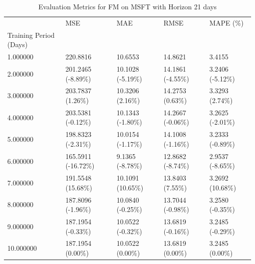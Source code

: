 \begin{table}
\caption{Evaluation Metrics for FM on MSFT with Horizon 21 days}
\label{tab:fm_MSFT_h21_metrics}
\begin{tabular}{lllll}
\toprule
 & MSE & MAE & RMSE & MAPE (\%) \\
Training Period (Days) &  &  &  &  \\
\midrule
1.000000 & 220.8816 & 10.6553 & 14.8621 & 3.4155 \\
2.000000 & 201.2465 (-8.89\%) & 10.1028 (-5.19\%) & 14.1861 (-4.55\%) & 3.2406 (-5.12\%) \\
3.000000 & 203.7837 (1.26\%) & 10.3206 (2.16\%) & 14.2753 (0.63\%) & 3.3293 (2.74\%) \\
4.000000 & 203.5381 (-0.12\%) & 10.1343 (-1.80\%) & 14.2667 (-0.06\%) & 3.2625 (-2.01\%) \\
5.000000 & 198.8323 (-2.31\%) & 10.0154 (-1.17\%) & 14.1008 (-1.16\%) & 3.2333 (-0.89\%) \\
6.000000 & 165.5911 (-16.72\%) & 9.1365 (-8.78\%) & 12.8682 (-8.74\%) & 2.9537 (-8.65\%) \\
7.000000 & 191.5548 (15.68\%) & 10.1091 (10.65\%) & 13.8403 (7.55\%) & 3.2692 (10.68\%) \\
8.000000 & 187.8096 (-1.96\%) & 10.0840 (-0.25\%) & 13.7044 (-0.98\%) & 3.2580 (-0.35\%) \\
9.000000 & 187.1954 (-0.33\%) & 10.0522 (-0.32\%) & 13.6819 (-0.16\%) & 3.2485 (-0.29\%) \\
10.000000 & 187.1954 (0.00\%) & 10.0522 (0.00\%) & 13.6819 (0.00\%) & 3.2485 (0.00\%) \\
\bottomrule
\end{tabular}
\end{table}
